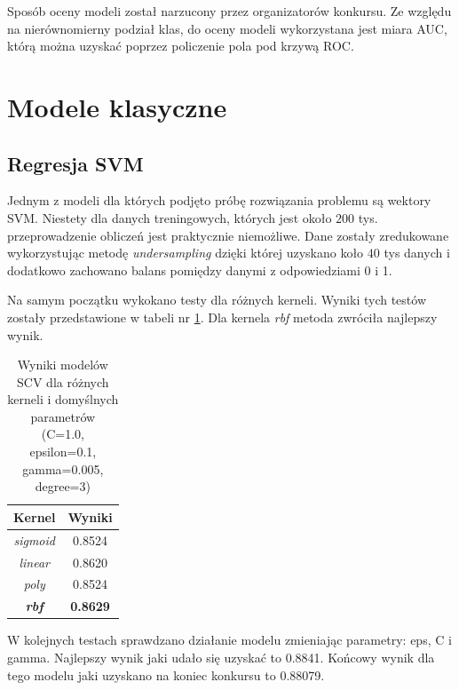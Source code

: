 \documentclass[12pt]{article}
\begin{document}
Sposób oceny modeli został narzucony przez organizatorów konkursu. Ze względu na nierównomierny podział klas, do oceny modeli wykorzystana jest miara AUC, którą można uzyskać poprzez policzenie pola pod krzywą ROC.


\section{Modele klasyczne}

\subsection{Regresja SVM}
Jednym z modeli dla których podjęto próbę rozwiązania problemu są wektory SVM. Niestety dla danych treningowych, których jest około $200$ tys. przeprowadzenie obliczeń jest praktycznie niemożliwe. Dane zostały zredukowane wykorzystując metodę \textit{undersampling} dzięki której uzyskano koło $40$ tys danych i dodatkowo zachowano balans pomiędzy danymi z odpowiedziami 0 i 1.

Na samym początku wykokano testy dla różnych kerneli. Wyniki tych testów zostały przedstawione w tabeli nr \ref{tab:svm_kernels}. Dla kernela \textit{rbf} metoda zwróciła najlepszy wynik.
\begin{table}[H]
    \centering
    \begin{tabular}{|c|c|}
    \hline
    Kernel & Wyniki \\
    \hline
    \hline
    \textit{sigmoid} &	0.8524 \\
    \hline
    \textit{linear} &	0.8620 \\
    \hline
    \textit{poly} &	0.8524 \\
    \hline
    \textbf{\textit{rbf}} &	\textbf{0.8629} \\
    \hline
    \end{tabular}
    \caption{Wyniki modelów SCV dla różnych kerneli i domyślnych parametrów (C=1.0, epsilon=0.1, gamma=0.005, degree=3)}
    \label{tab:svm_kernels}
\end{table}

W kolejnych testach sprawdzano działanie modelu zmieniając parametry: eps, C i gamma. Najlepszy wynik jaki udało się uzyskać to 0.8841. Końcowy wynik dla tego modelu jaki uzyskano na koniec konkursu to 0.88079.
\end{document}
